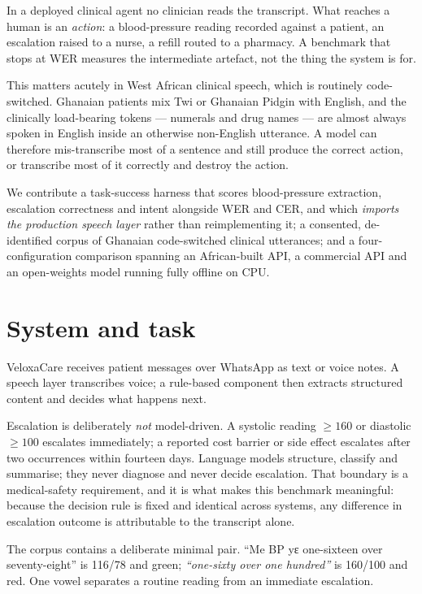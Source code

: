\documentclass[a4paper,10pt,twocolumn]{article}
\newcommand{\twi}[1]{{\twifont #1}}
\begin{document}
In a deployed clinical agent no clinician reads the transcript. What reaches a
human is an \emph{action}: a blood-pressure reading recorded against a patient,
an escalation raised to a nurse, a refill routed to a pharmacy. A benchmark that
stops at WER measures the intermediate artefact, not the thing the system is for.

This matters acutely in West African clinical speech, which is routinely
code-switched. Ghanaian patients mix Twi or Ghanaian Pidgin with English, and the
clinically load-bearing tokens --- numerals and drug names --- are almost always
spoken in English inside an otherwise non-English utterance. A model can
therefore mis-transcribe most of a sentence and still produce the correct action,
or transcribe most of it correctly and destroy the action.

We contribute a task-success harness that scores blood-pressure extraction,
escalation correctness and intent alongside WER and CER, and which \emph{imports
the production speech layer} rather than reimplementing it; a consented,
de-identified corpus of Ghanaian code-switched clinical utterances; and a
four-configuration comparison spanning an African-built API, a commercial API and
an open-weights model running fully offline on CPU.

\section{System and task}

VeloxaCare receives patient messages over WhatsApp as text or voice notes. A
speech layer transcribes voice; a rule-based component then extracts structured
content and decides what happens next.

Escalation is deliberately \emph{not} model-driven. A systolic reading
$\geq 160$ or diastolic $\geq 100$ escalates immediately; a reported cost barrier
or side effect escalates after two occurrences within fourteen days. Language
models structure, classify and summarise; they never diagnose and never decide
escalation. That boundary is a medical-safety requirement, and it is what makes
this benchmark meaningful: because the decision rule is fixed and identical
across systems, any difference in escalation outcome is attributable to the
transcript alone.

The corpus contains a deliberate minimal pair. \twi{``Me BP yɛ one-sixteen over
seventy-eight''} is 116/78 and green; \emph{``one-sixty over one hundred''} is
160/100 and red. One vowel separates a routine reading from an immediate
escalation.
\end{document}
